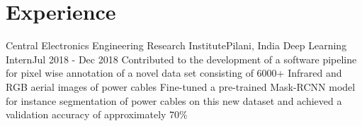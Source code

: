 \section{Experience}
\resumeSubHeadingListStart

\resumeHeadingFour
{Central Electronics Engineering Research Institute}{Pilani, India}
{Deep Learning Intern}{Jul 2018 - Dec 2018}
\resumeItemListStart
{}
{Contributed to the development of a software pipeline for pixel wise annotation of a novel data set consisting of 6000+ Infrared and RGB aerial images of power cables}
{Fine-tuned a pre-trained Mask-RCNN model for instance segmentation of power cables on this new dataset and achieved a validation accuracy of approximately 70\%}
\resumeItemListEnd

\resumeSubHeadingListEnd
